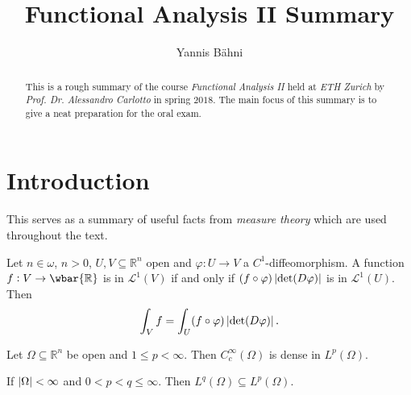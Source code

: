 

\setcounter{section}{1}

\title{Functional Analysis II Summary}
\author{Yannis B\"{a}hni}
\address[Yannis B\"{a}hni]{University of Zurich, R\"{a}mistrasse 71, 8006 Zurich}



\begin{abstract}
	This is a rough summary of the course \emph{Functional Analysis II} held at \emph{ETH Zurich} by \emph{Prof. Dr. Alessandro Carlotto} in spring $2018$. The main focus of this summary is to give a neat preparation for the oral exam.
\end{abstract}

\maketitle

\tableofcontents

\section*{Introduction}
This serves as a summary of useful facts from \emph{measure theory} which are used throughout the text.
\begin{theorem}
	Let $n \in \omega$, $n > 0$, $U,V \subseteq \mathbb{R}^n$ open and $\varphi : U \to V$ a $C^1$-diffeomorphism. A function $f : V \to \wbar{\mathbb{R}}$ is in $\mathcal{L}^1(V)$ if and only if $(f \circ \varphi) \abs[0]{\det (D\varphi)}$ is in $\mathcal{L}^1(U)$. Then
	\begin{equation*}
		\int_V f = \int_U (f \circ \varphi) \abs[0]{\det (D\varphi)}.
	\end{equation*}
\end{theorem}

\begin{theorem}
	Let $\Omega \subseteq \mathbb{R}^n$ be open and $1 \leq p < \infty$. Then $C^\infty_c(\Omega)$ is dense in $L^p(\Omega)$.
\end{theorem}

\begin{proposition}
	\label{prop:inclusion}
	If $\abs[0]{\Omega} < \infty$ and $0 < p < q \leq \infty$. Then $L^q(\Omega) \subseteq L^p(\Omega)$.
\end{proposition}

